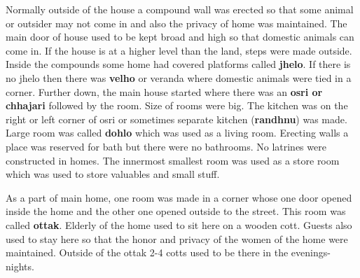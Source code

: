 Normally outside of the house a compound wall was erected so that some animal or
outsider may not come in and also the privacy of home was maintained. The main
door of house used to be kept broad and high so that domestic animals can come
in. If the house is at a higher level than the land, steps were made outside.
Inside the compounds some home had covered platforms called \textbf{jhelo}. If
there is no jhelo then there was \textbf{velho} or veranda where domestic
animals were tied in a corner. Further down, the main house started where there
was an \textbf{osri or chhajari} followed by the room. Size of rooms were big.
The kitchen was on the right or left corner of osri or sometimes separate
kitchen (\textbf{randhnu}) was made. Large room was called \textbf{dohlo} which
was used as a living room. Erecting walls a place was reserved for bath but
there were no bathrooms. No latrines were constructed in homes. The innermost
smallest room was used as a store room which was used to store valuables and
small stuff. 

As a part of main home, one room was made in a corner whose one door opened
inside the home and the other one opened outside to the street. This room was
called \textbf{ottak}. Elderly of the home used to sit here on a wooden cott.
Guests also used to stay here so that the honor and privacy of the women of the
home were maintained. Outside of the ottak 2-4 cotts used to be there in
the evenings-nights.

